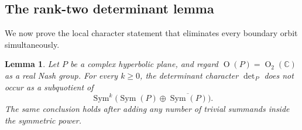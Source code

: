 \documentclass[10pt,a4paper]{amsart}
\numberwithin{equation}{section}
\newtheorem{lemma}[theorem]{Lemma}
\newcommand{\C}{\mathbb C}
\newcommand{\Or}{\operatorname{O}}
\newcommand{\Sym}{\operatorname{Sym}}
\begin{document}
\subsection{The rank-two determinant lemma}\label{spin:sec:detlemma}

We now prove the local character statement that eliminates every boundary
orbit simultaneously.

\begin{lemma}\label{spin:lem:det-ranktwo}
Let $P$ be a complex hyperbolic plane, and regard $\Or(P)=\Or_2(\C)$ as a real
Nash group.  For every $k\ge0$, the determinant character $\det_P$ does not
occur as a subquotient of
\begin{equation}\label{spin:eq:det-ranktwo-module}
  \Sym^k\bigl(\Sym(P)\oplus\overline{\Sym(P)}\bigr).
\end{equation}
The same conclusion holds after adding any number of trivial summands inside
the symmetric power.
\end{lemma}
\end{document}
